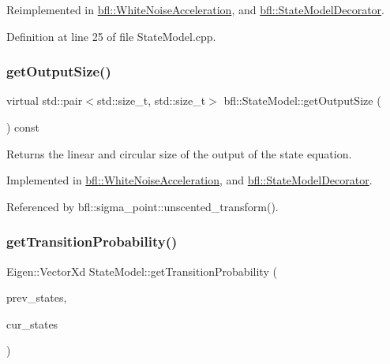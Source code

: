 Reimplemented in \mbox{\hyperlink{classbfl_1_1WhiteNoiseAcceleration_a819bd0d5510c9863272b422ab33b7adc}{bfl\+::\+White\+Noise\+Acceleration}}, and \mbox{\hyperlink{classbfl_1_1StateModelDecorator_a6825b807be82c66feb8bbb62d240490b}{bfl\+::\+State\+Model\+Decorator}}.



Definition at line 25 of file State\+Model.\+cpp.

\mbox{\label{classbfl_1_1StateModel_a6bf680b689389d959fc9ac46595e6dab}} 
\subsubsection{\texorpdfstring{get\+Output\+Size()}{getOutputSize()}}
{\footnotesize\ttfamily virtual std\+::pair$<$std\+::size\+\_\+t, std\+::size\+\_\+t$>$ bfl\+::\+State\+Model\+::get\+Output\+Size (\begin{DoxyParamCaption}{ }\end{DoxyParamCaption}) const\hspace{0.3cm}{\ttfamily [pure virtual]}}



Returns the linear and circular size of the output of the state equation. 



Implemented in \mbox{\hyperlink{classbfl_1_1WhiteNoiseAcceleration_ac3e447bf2f520b543c67d066f72423b7}{bfl\+::\+White\+Noise\+Acceleration}}, and \mbox{\hyperlink{classbfl_1_1StateModelDecorator_a2b2f00e6825e382587a2edbbba4569de}{bfl\+::\+State\+Model\+Decorator}}.



Referenced by bfl\+::sigma\+\_\+point\+::unscented\+\_\+transform().

\mbox{\label{classbfl_1_1StateModel_acb582cb7d41ec7b854ed1dbd8965b6fc}} 
\subsubsection{\texorpdfstring{get\+Transition\+Probability()}{getTransitionProbability()}}
{\footnotesize\ttfamily Eigen\+::\+Vector\+Xd State\+Model\+::get\+Transition\+Probability (\begin{DoxyParamCaption}\item[{const Eigen\+::\+Ref$<$ const Eigen\+::\+Matrix\+Xd $>$ \&}]{prev\+\_\+states,  }\item[{Eigen\+::\+Ref$<$ Eigen\+::\+Matrix\+Xd $>$}]{cur\+\_\+states }\end{DoxyParamCaption})\hspace{0.3cm}{\ttfamily [virtual]}}



